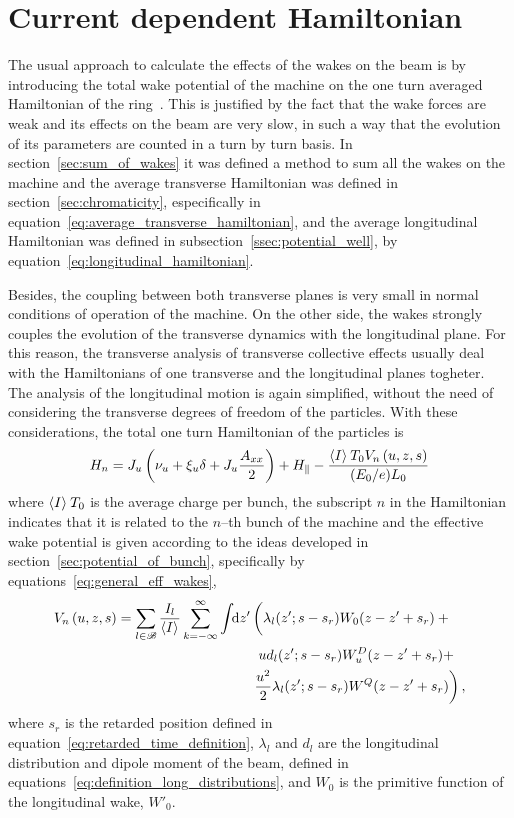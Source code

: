\section{Current dependent Hamiltonian}

    The usual approach to calculate the effects of the wakes on the beam is by introducing the total wake potential of the machine on the one turn averaged Hamiltonian of the ring~\cite{Berg1996,Lindberg2016}. This is justified by the fact that the wake forces are weak and its effects on the beam are very slow, in such a way that the evolution of its parameters are counted in a turn by turn basis. In section~\ref{sec:sum_of_wakes} it was defined a method to sum all the wakes on the machine and the average transverse Hamiltonian was defined in section~\ref{sec:chromaticity}, especifically in equation~\eqref{eq:average_transverse_hamiltonian}, and the average longitudinal Hamiltonian was defined in subsection~\ref{ssec:potential_well}, by equation~\eqref{eq:longitudinal_hamiltonian}.

    Besides, the coupling between both transverse planes is very small in normal conditions of operation of the machine. On the other side, the wakes strongly couples the evolution of the transverse dynamics with the longitudinal plane. For this reason, the transverse analysis of transverse collective effects usually deal with the Hamiltonians of one transverse and the longitudinal planes togheter. The analysis of the longitudinal motion is again simplified, without the need of considering the transverse degrees of freedom of the particles. With these considerations, the total one turn Hamiltonian of the particles is
    \begin{align}\label{eq:current_depend_hamiltonian}
        H_n = J_u\left(\nu_u + \xi_u\delta + J_u\frac{A_{xx}}{2}\right) +
                H_{\parallel} - \frac{\left\langle I \right\rangle_{{}}T_0V_n\left(u, z, s\right)}{(E_0/e)L_0}
    \end{align}
    where $\left\langle I \right\rangle_{{}}T_0$ is the average charge per bunch, the subscript $n$ in the Hamiltonian indicates that it is related to the $n$--th bunch of the machine and the effective wake potential is given according to the ideas developed in section~\ref{sec:potential_of_bunch}, specifically by equations~\eqref{eq:general_eff_wakes},
    \begin{align}\label{eq:generalwake}
        V_n\fof{u, z, s} =\nonumber \sum_{l\in\mathscr{B}}\frac{I_l}{\average{I}}\sum_{k=-\infty}^\infty\udefint{z'}{
        &\left(\lambda_l(z'; s - s_r) W_0(z-z' + s_r) + \vphantom{\frac{u^2}{2}}\right.\\\nonumber
        &\hphantom{u}ud_l(z'; s -s_r) W^D_u(z-z' + s_r) +\\
        &\left. \frac{u^2}{2}\lambda_l(z'; s - s_r) W^Q(z-z' + s_r)\right)},
    \end{align}
    where $s_r$ is the retarded position defined in equation~\eqref{eq:retarded_time_definition}, $\lambda_l$ and $d_l$ are the longitudinal distribution and dipole moment of the beam, defined in equations~\eqref{eq:definition_long_distributions}, and $W_0$ is the primitive function of the longitudinal wake, $W'_0$.

